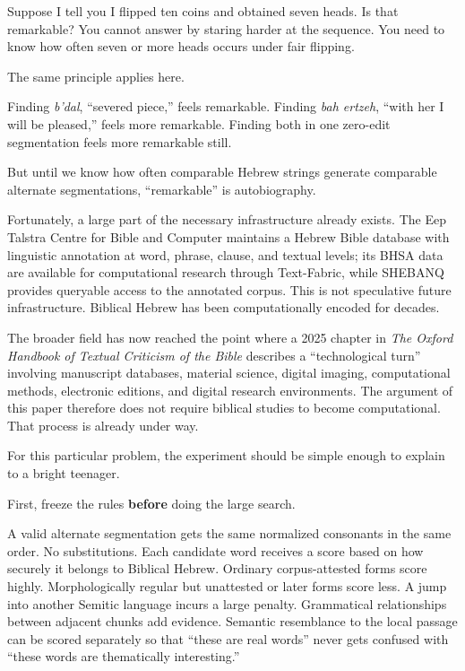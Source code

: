 Suppose I tell you I flipped ten coins and obtained seven heads. Is that remarkable? You cannot answer by staring harder at the sequence. You need to know how often seven or more heads occurs under fair flipping.

The same principle applies here.

Finding \textit{b'dal}, ``severed piece,'' feels remarkable. Finding \textit{bah ertzeh}, ``with her I will be pleased,'' feels more remarkable. Finding both in one zero-edit segmentation feels more remarkable still.

But until we know how often comparable Hebrew strings generate comparable alternate segmentations, ``remarkable'' is autobiography.

Fortunately, a large part of the necessary infrastructure already exists. The Eep Talstra Centre for Bible and Computer maintains a Hebrew Bible database with linguistic annotation at word, phrase, clause, and textual levels; its BHSA data are available for computational research through Text-Fabric, while SHEBANQ provides queryable access to the annotated corpus. This is not speculative future infrastructure. Biblical Hebrew has been computationally encoded for decades.\cite{ETCBC}

The broader field has now reached the point where a 2025 chapter in \textit{The Oxford Handbook of Textual Criticism of the Bible} describes a ``technological turn'' involving manuscript databases, material science, digital imaging, computational methods, electronic editions, and digital research environments. The argument of this paper therefore does not require biblical studies to become computational. That process is already under way.\cite{Longacre2025}

For this particular problem, the experiment should be simple enough to explain to a bright teenager.

First, freeze the rules \textbf{before} doing the large search.

A valid alternate segmentation gets the same normalized consonants in the same order. No substitutions. Each candidate word receives a score based on how securely it belongs to Biblical Hebrew. Ordinary corpus-attested forms score highly. Morphologically regular but unattested or later forms score less. A jump into another Semitic language incurs a large penalty. Grammatical relationships between adjacent chunks add evidence. Semantic resemblance to the local passage can be scored separately so that ``these are real words'' never gets confused with ``these words are thematically interesting.''


